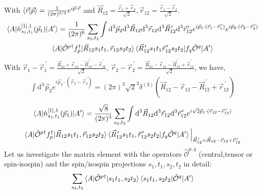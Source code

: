 \documentclass[10pt]{article}
\begin{document}
With $\braket{ \vec{r} | \vec{p} } = \frac{1}{(2 \pi)^{3/2}} e^{i \vec{p} \cdot \vec{r}}$ and $ \vec{R}_{12} = \frac{\vec{r}_{1} + \vec{r}_{2}}{\sqrt{2}}, \vec{r}_{12} = \frac{\vec{r}_{1} - \vec{r}_{2}}{\sqrt{2}}$.
\begin{multline*}
	\braket{ A | \hat{n}_{s_1,t_1}^{[1],1}(\vec{p}_1) | A'} =  \frac{1}{(2 \pi)^{6}} \sum_{s_2,t_2} \int \text{d}^{3} \vec{p}_{2} \text{d}^{3} \vec{R}_{12} \text{d}^{3} \vec{r}_{12} \text{d}^{3} \vec{R}_{12}^{\, \prime} \text{d}^{3} \vec{r}_{12}^{\, \prime}  e^{ i \vec{p}_{1} \cdot ( \vec{r}_{1} - \vec{r}_{1}^{\, \prime}) } e^{ i \vec{p}_{2} \cdot ( \vec{r}_{2} - \vec{r}_{2}^{\, \prime} )} \\
	\braket{ A | \hat{\mathcal{O}}^{p\dagger} f_{p}^{\dagger} | \vec{R}_{12} s_1 t_1, \vec{r}_{12} s_2 t_2 } \braket{ \vec{R}_{12}^{\, \prime} s_1 t_1 \vec{r}_{12}^{\, \prime} s_2 t_2 | f_{q} \hat{ \mathcal{O}}^{q} | A'}
\end{multline*}
With $ \vec{r}_{1} - \vec{r}_{1}^{\, \prime} = \frac{\vec{R}_{12} + \vec{r}_{12} - \vec{R}_{12}^{\, \prime} - \vec{r}_{12}^{\, \prime}}{\sqrt{2}}$, $\vec{r}_{2} - \vec{r}_{2}^{\, \prime} = \frac{\vec{R}_{12} - \vec{r}_{12} - \vec{R}_{12}^{\, \prime} + \vec{r}_{12}^{\, \prime}}{\sqrt{2}}$, we have,
\begin{align*}
	\int \text{d}^{3} \vec{p}_{2} e^{ i \vec{p}_{2} \cdot ( \vec{r}_{2} - \vec{r}_{2}^{\, \prime} )} = (2 \pi)^{3} \sqrt{2}^{3} \delta^{(3)}( \vec{R}_{12} - \vec{r}_{12} - \vec{R}_{12}^{\, \prime} + \vec{r}_{12}^{\, \prime} )
\end{align*}
\begin{multline*}
	\braket{ A | \hat{n}_{s_1, t_1}^{[1],1}(\vec{p}_1) | A'} = \frac{\sqrt{8}}{(2 \pi)^{3}} \sum_{s_2,t_2} \int \text{d}^{3} \vec{R}_{12} \text{d}^{3} \vec{r}_{12} \text{d}^{3} \vec{r}_{12}^{\, \prime}  e^{ i \sqrt{2} \vec{p}_{1} \cdot ( \vec{r}_{12} - \vec{r}_{12}^{\, \prime}) } \\
	 \braket{ A | \hat{\mathcal{O}}^{p\dagger} f_{p}^{\dagger} | \vec{R}_{12} s_1 t_1, \vec{r}_{12} s_2 t_2 } \braket{ \vec{R}_{12}^{\, \prime} s_1 t_1 , \vec{r}_{12}^{\, \prime} s_2 t_2 | f_{q} \hat{ \mathcal{O}}^{q} | A'} \Big|_{\vec{R}_{12}^{\, \prime} = \vec{R}_{12} - \vec{r}_{12}  + \vec{r}_{12}^{\, \prime} }
\end{multline*}
Let us investigate the matrix element with the operators $ \hat{\mathcal{O}}^{p,q}$ (central,tensor or spin-isospin) and the spin/isospin projections $s_1,t_1,s_2,t_2$ in detail: 
\begin{align*}
\sum_{s_2,t_2} \braket{ A | \hat{\mathcal{O}}^{p\dagger} | s_1 t_1, s_2 t_2} \braket{ s_1 t_1, s_2 t_2 | \hat{ \mathcal{O}}^{q} | A'}
\end{align*}
\end{document}
